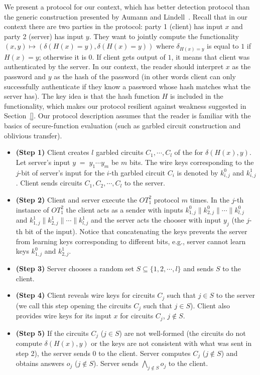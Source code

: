 \documentclass[12pt]{article}
\begin{document}
We present a protocol for our context, which has better detection
protocol than the generic construction presented by Aumann and
Lindell~\cite{}.  Recall that in our context there are two parties in
the protocol: party 1 (client) has input $x$ and party 2 (server) has
input $y$. They want to jointly compute the functionality $(x,y)
\longmapsto ( \delta (H(x) = y),\delta (H(x) = y))$ where
$\delta_{H(x) = y}$ is equal to $1$ if $H(x) = y$; otherwise it is
$0$. If client gets output of $1$, it means that client was
authenticated by the server. In our context, the reader should
interpret $x$ as the password and $y$ as the hash of the password (in
other words client can only successfully authenticate if they know a
password whose hash matches what the server has). The key idea is that
the hash function $H$ is included in the functionality, which makes
our protocol resilient against weakness suggested in
Section~\ref{}. Our protocol description assumes that the reader is
familiar with the basics of secure-function evaluation (such as
garbled circuit construction and oblivious transfer).

\begin{itemize}

\item {\bf (Step 1)}  Client creates $l$ garbled circuits $C_1,\cdots,C_l$ of the  for $\delta (H(x), y)$. Let server's 
input $y \; = \; y_1 \cdots y_m$ be $m$ bits. The wire keys corresponding
to the $j$-bit of server's input for the $i$-th garbled circuit $C_i$
is denoted by $k^0_{i,j}$ and $k^1_{i,j}$. Client sends circuits
$C_1,C_2,\cdots,C_l$ to the server.

\item {\bf (Step 2)} Client and server execute the $OT_1^2$ protocol $m$ times. In the $j$-th instance of $OT_1^2$ the
client acts as a sender with inputs $k^0_{1,j} \| k^0_{2,j} \| \cdots
\| k^0_{l,j}$ and $k^1_{1,j} \| k^1_{2,j} \| \cdots \| k^1_{l,j}$ and
the server acts the chooser with input $y_j$ (the $j$-th bit of the
input). Notice that concatenating the keys prevents the server from
learning keys corresponding to different bits, e.g., server cannot
learn keys $k^0_{1,j}$ and $k^1_{2,j}$.

\item {\bf (Step 3)} Server chooses a random set $S \subseteq \{ 1,2, \cdots , l \}$ and sends $S$ to the client.

\item {\bf (Step 4)} Client reveals wire keys for circuits $C_j$ such that $j \in S$ to the server (we call this step opening the
circuits $C_j$ such that $j \in S$). Client also provides wire keys for its input $x$ for circuits $C_j$, $j \not\in S$.

\item {\bf (Step 5)} If the circuits $C_j$ ($j \in S$) are not well-formed (the circuits do not compute $\delta (H(x),y)$ or the 
keys are not consistent with what was sent in step 2), the server
sends $0$ to the client. Server computes $C_j$ ($j \not\in S$) and
obtains answers $o_j$ ($j \not\in S$). Server sends $\bigwedge_{j
\not\in S} o_j$ to the client.



\end{itemize}
\end{document}
